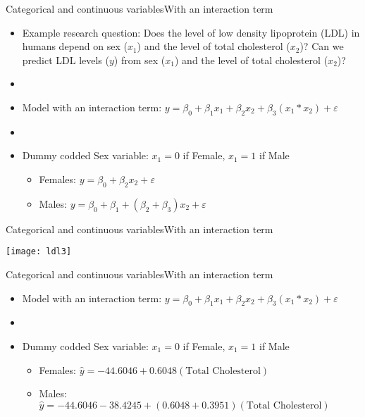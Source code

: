 \documentclass[xcolor=dvipsnames]{beamer}
\begin{document}
\begin{frame}{Categorical and continuous variables}{With an interaction term}
	\begin{itemize}
		\item Example research question: Does the level of low density lipoprotein (LDL) in humans depend on sex ($x_1$) and the level of total cholesterol ($x_2$)? Can we predict LDL levels ($y$) from sex ($x_1$) and the level of total cholesterol ($x_2$)?
		\item[]
		\item Model with an interaction term: $y = \beta_0 + \beta_1 x_1 + \beta_2 x_2 + \beta_3 (x_1 * x_2) + \varepsilon $
		\item[]
		\item Dummy codded Sex variable: $x_1 = 0$ if Female, $x_1 = 1$ if Male
		\begin{itemize}
			\item Females: $y = \beta_0 + \beta_2 x_2 + \varepsilon $
			\item Males: $y = \beta_0 + \beta_1 + (\beta_2 + \beta_3) x_2 + \varepsilon $
		\end{itemize}
	\end{itemize}
\end{frame}

\begin{frame}{Categorical and continuous variables}{With an interaction term}
	\begin{center}
		\texttt{[image: ldl3]}
	\end{center}
\end{frame}

\begin{frame}{Categorical and continuous variables}{With an interaction term}
	\begin{itemize}
		\item Model with an interaction term: $y = \beta_0 + \beta_1 x_1 + \beta_2 x_2 + \beta_3 (x_1 * x_2) + \varepsilon $
		\item[]
		\item Dummy codded Sex variable: $x_1 = 0$ if Female, $x_1 = 1$ if Male
		\begin{itemize}
			\item Females: $\hat{y} = -44.6046 + 0.6048 (\text{Total Cholesterol})  $
			\item Males: $\hat{y} = -44.6046  -38.4245 + (0.6048 + 0.3951)(\text{Total Cholesterol}) $
		\end{itemize}
	\end{itemize}
\end{frame}
\end{document}
